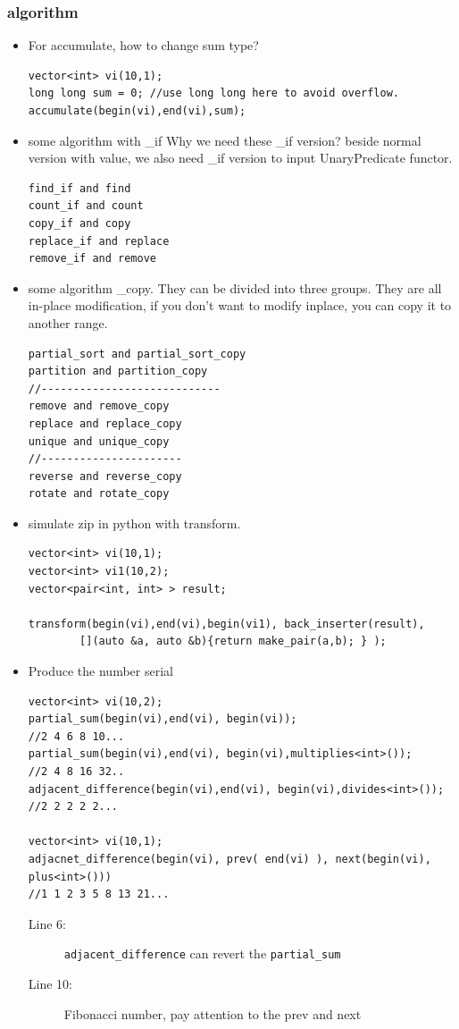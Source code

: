 \documentclass[a4paper,11pt,twoside]{book}
\begin{document}
\subsubsection{algorithm}
\begin{itemize}

\item For accumulate, how to change sum type?
\begin{lstlisting}
vector<int> vi(10,1);
long long sum = 0; //use long long here to avoid overflow.
accumulate(begin(vi),end(vi),sum);
\end{lstlisting}

\item some algorithm with \_if  Why we need these \_if version? beside normal version with value, we also need \_if version to input UnaryPredicate functor. 
\begin{lstlisting}
find_if and find
count_if and count
copy_if and copy
replace_if and replace
remove_if and remove
\end{lstlisting}

\item some algorithm \_copy. They can be divided into three groups. They are all in-place modification, if you don't want to modify inplace, you can copy it to another range.
\begin{lstlisting}
partial_sort and partial_sort_copy
partition and partition_copy
//----------------------------
remove and remove_copy
replace and replace_copy
unique and unique_copy
//----------------------
reverse and reverse_copy
rotate and rotate_copy
\end{lstlisting}

\item simulate zip in python with transform.
\begin{lstlisting}
vector<int> vi(10,1);
vector<int> vi1(10,2);
vector<pair<int, int> > result;

transform(begin(vi),end(vi),begin(vi1), back_inserter(result),
        [](auto &a, auto &b){return make_pair(a,b); } );
\end{lstlisting}

\item Produce the number serial
\begin{lstlisting}
vector<int> vi(10,2);
partial_sum(begin(vi),end(vi), begin(vi));
//2 4 6 8 10...
partial_sum(begin(vi),end(vi), begin(vi),multiplies<int>());
//2 4 8 16 32..
adjacent_difference(begin(vi),end(vi), begin(vi),divides<int>());
//2 2 2 2 2...

vector<int> vi(10,1);
adjacnet_difference(begin(vi), prev( end(vi) ), next(begin(vi), plus<int>()))
//1 1 2 3 5 8 13 21...
\end{lstlisting}
\begin{description}
\item[Line 6:] \texttt{adjacent\_difference} can revert the \texttt{partial\_sum}
\item[Line 10:] Fibonacci number, pay attention to the prev and next
\end{description}


\end{itemize}
\end{document}
